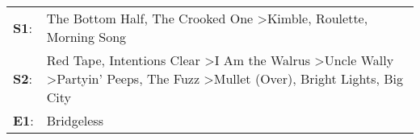 \begin{supertabular}{p{0.03\textwidth}p{0.92\textwidth}}
 \textbf{S1}:  &                                                                                                                                                                                 The Bottom Half\textsuperscript{}, \enspace The Crooked One\textsuperscript{} \textgreater \enspace Kimble\textsuperscript{}, \enspace Roulette\textsuperscript{}, \enspace Morning Song\textsuperscript{}  \enspace  \\
 \textbf{S2}:  &  Red Tape\textsuperscript{}, \enspace Intentions Clear\textsuperscript{} \textgreater \enspace I Am the Walrus\textsuperscript{} \textgreater \enspace Uncle Wally\textsuperscript{} \textgreater \enspace Partyin' Peeps\textsuperscript{}, \enspace The Fuzz\textsuperscript{} \textgreater \enspace Mullet (Over)\textsuperscript{}, \enspace Bright Lights, Big City\textsuperscript{}  \enspace  \\
 \textbf{E1}:  &                                                                                                                                                                                                                                                                                                                                                               Bridgeless\textsuperscript{}  \enspace  \\
\end{supertabular}
